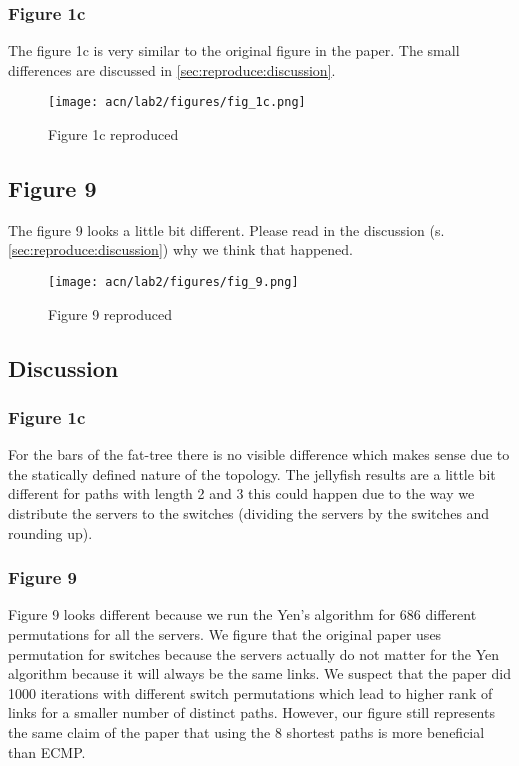 \documentclass[a4paper,11pt]{article}
\begin{document}
\subsubsection{Figure 1c}

The figure 1c is very similar to the original figure in the paper.
The small differences are discussed in \autoref{sec:reproduce:discussion}.

\begin{figure}[ht]
    \centering
    \texttt{[image: acn/lab2/figures/fig\_1c.png]}
    \caption{Figure 1c reproduced}
    \label{fig:jelly6}
\end{figure}

\subsection{Figure 9}
\label{sec:reproduce:fig9}
The figure 9 looks a little bit different.
Please read in the discussion (s. \autoref{sec:reproduce:discussion}) why we think that happened.

\begin{figure}[ht]
    \centering
    \texttt{[image: acn/lab2/figures/fig\_9.png]}
    \caption{Figure 9 reproduced}
    \label{fig:jelly6}
\end{figure}

\newpage

\subsection{Discussion}
\label{sec:reproduce:discussion}

\subsubsection{Figure 1c}

For the bars of the fat-tree there is no visible difference which makes sense due to the statically defined nature of the topology.
The jellyfish results are a little bit different for paths with length 2 and 3 this could happen due to the way we distribute the servers to the switches (dividing the servers by the switches and rounding up).

\subsubsection{Figure 9}
Figure 9 looks different because we run the Yen's algorithm for 686 different permutations for all the servers.
We figure that the original paper uses permutation for switches because the servers actually do not matter for the Yen algorithm because it will always be the same links.
We suspect that the paper did 1000 iterations with different switch permutations which lead to higher rank of links for a smaller number of distinct paths.
However, our figure still represents the same claim of the paper that using the 8 shortest paths is more beneficial than ECMP.
\end{document}
